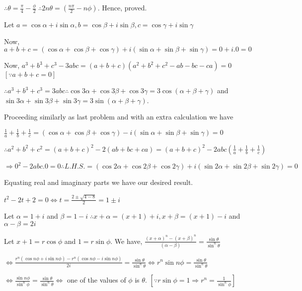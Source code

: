   $\therefore \theta = \frac{\pi}{4} - \frac{\phi}{2}\;\therefore 2n\theta = \left(\frac{n\pi}{2} -
  n\phi\right)$. Hence, proved.
\item Let $a = \cos\alpha + i \sin\alpha, b = \cos\beta + i \sin\beta, c = \cos\gamma + i \sin\gamma$

  Now, $a + b + c = (\cos\alpha + \cos\beta + \cos\gamma) + i(\sin\alpha + \sin\beta + \sin\gamma) = 0 +
  i.0 = 0$

  Now, $a^3 + b^3 + c^3 - 3abc = (a + b + c)(a^2 + b^2 + c^2 - ab - bc - ca) = 0$ $[\because a + b + c = 0]$

  $\therefore a^3 + b^3 + c^3 = 3abc\therefore \cos3\alpha + \cos3\beta + \cos3\gamma = 3\cos(\alpha +
  \beta + \gamma)$ and $\sin3\alpha + \sin3\beta + \sin3\gamma = 3\sin(\alpha + \beta + \gamma)$.
\item Proceeding similarly as last problem and with an extra calculation we have

  $\frac{1}{a} + \frac{1}{b} + \frac{1}{c} = (\cos\alpha + \cos\beta + \cos\gamma) - i(\sin\alpha +
  \sin\beta + \sin\gamma) = 0$

  $\therefore a^2 + b^2 + c^2 = (a + b + c)^2 - 2(ab + bc + ca) = (a + b + c)^2 - 2 abc\left(\frac{1}{a} +
  \frac{1}{b} + \frac{1}{c}\right)$

  $\Rightarrow 0^2 - 2abc.0 = 0\therefore L.H.S. = (\cos2\alpha + \cos2\beta + \cos2\gamma) + i(\sin2\alpha
  + \sin2\beta + \sin2\gamma) = 0$

  Equating real and imaginary parts we have our desired result.
\item $t^2 -2t + 2 = 0 \Leftrightarrow t = \frac{2 \pm \sqrt{4 - 8}}{2} = 1 \pm i$

  Let $\alpha = 1+ i$ and $\beta = 1 - i\;\therefore x + \alpha = (x + 1) + i, x + \beta = (x + 1) - i$
  and $\alpha - \beta = 2i$

  Let $x + 1 = r\cos\phi$ and $1 = r\sin\phi$. We have, $\frac{(x + \alpha)^n - (x + \beta)^n}{(\alpha -
    \beta)} = \frac{\sin\theta}{\sin^n\theta}$

 $ \Leftrightarrow \frac{r^n(\cos n\phi + i \sin n\phi) - r^n(\cos n\phi - i\sin n\phi)}{2i} =
  \frac{\sin\theta}{\sin^n\theta} \Leftrightarrow r^n \sin n\phi = \frac{\sin\theta}{\sin^n\theta}$

  $\Leftrightarrow \frac{\sin n\phi}{\sin^n\phi} = \frac{\sin\theta}{\sin^n\theta} \Leftrightarrow$ one of
  the values of $\phi$ is $\theta$. $\left[\because r\sin\phi = 1\Rightarrow r^n =
    \frac{1}{\sin^n\phi}\right]$

